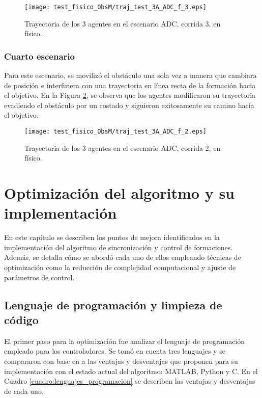 \begin{figure}[H]
	\centering
	\texttt{[image: test\_fisico\_ObsM/traj\_test\_3A\_ADC\_f\_3.eps]}
	\caption{Trayectoria de los 3 agentes en el escenario ADC, corrida 3, en físico.}
	\label{fig:traj_test_3A_ADC_f_3}
\end{figure}

\subsection{Cuarto escenario}
Para este escenario, se movilizó el obstáculo una sola vez a manera que cambiara de posición e interfiriera con una trayectoria en línea recta de la formación hacia el objetivo. En la Figura \ref{fig:traj_test_3A_ADC_f_2}, se observa que los agentes modificaron su trayectoria evadiendo el obstáculo por un costado y siguieron exitosamente su camino hacia el objetivo.

\begin{figure}[H]
	\centering
	\texttt{[image: test\_fisico\_ObsM/traj\_test\_3A\_ADC\_f\_2.eps]}
	\caption{Trayectoria de los 3 agentes en el escenario ADC, corrida 2, en físico.}
	\label{fig:traj_test_3A_ADC_f_2}
\end{figure}


\chapter{Optimización del algoritmo y su implementación}\label{cap:optimizacion}
En este capítulo se describen los puntos de mejora identificados en la implementación del algoritmo de sincronización y control de formaciones. Además, se detalla cómo se abordó cada uno de ellos empleando técnicas de optimización como la reducción de complejidad computacional y ajuste de parámetros de control.

\section{Lenguaje de programación y limpieza de código}
El primer paso para la optimización fue analizar el lenguaje de programación empleado para los controladores. Se tomó en cuenta tres lenguajes y se compararon con base en a las ventajas y desventajas que proponen para su implementación con el estado actual del algoritmo: MATLAB, Python y C. En el Cuadro \ref{cuadro:lenguajes_programacion} se describen las ventajas y desventajas de cada uno.


